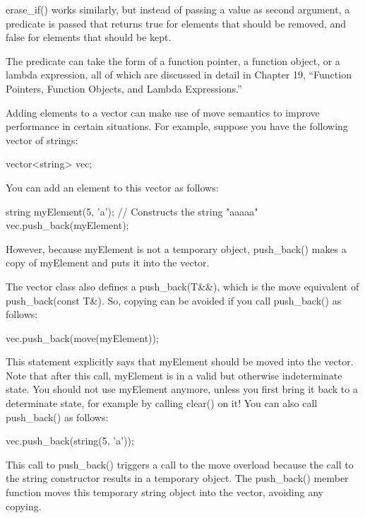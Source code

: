 erase\_if() works similarly, but instead of passing a value as second argument, a predicate is passed that returns true for elements that should be removed, and false for elements that should be kept.

The predicate can take the form of a function pointer, a function object, or a lambda expression, all of which are discussed in detail in Chapter 19, “Function Pointers, Function Objects, and Lambda Expressions.”


Adding elements to a vector can make use of move semantics to improve performance in certain situations. For example, suppose you have the following vector of strings:

\begin{cpp}
vector<string> vec;
\end{cpp}

You can add an element to this vector as follows:

\begin{cpp}
string myElement(5, 'a'); // Constructs the string "aaaaa"
vec.push_back(myElement);
\end{cpp}

However, because myElement is not a temporary object, push\_back() makes a copy of myElement and puts it into the vector.

The vector class also defines a push\_back(T\&\&), which is the move equivalent of push\_back(const T\&). So, copying can be avoided if you call push\_back() as follows:

\begin{cpp}
vec.push_back(move(myElement));
\end{cpp}

This statement explicitly says that myElement should be moved into the vector. Note that after this call, myElement is in a valid but otherwise indeterminate state. You should not use myElement anymore, unless you first bring it back to a determinate state, for example by calling clear() on it! You can also call push\_back() as follows:

\begin{cpp}
vec.push_back(string(5, 'a'));
\end{cpp}

This call to push\_back() triggers a call to the move overload because the call to the string constructor results in a temporary object. The push\_back() member function moves this temporary string object into the vector, avoiding any copying.

